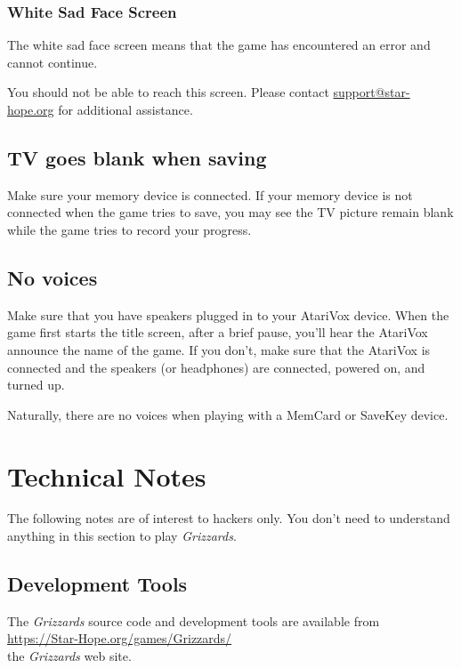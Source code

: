 \documentclass[10pt,twocolumn,openany,article]{memoir}
\begin{document}
\begin{description}
\subsection{White Sad Face Screen}

The white sad  face screen means that the game  has encountered an error
and cannot continue. 

You  should   not  be  able   to  reach  this  screen.   Please  contact
\href{mailto:support@star-hope.org}{support@star-hope.org}           for
additional assistance.


\section{TV goes blank when saving}

Make sure your memory device is  connected. If your memory device is not
connected when the game tries to save, you may see the TV picture remain
blank while the game tries to record your progress.

\section{No voices}

Make sure  that you have  speakers plugged  in to your  AtariVox device.
When the game first starts the title screen, after a brief pause, you'll
hear the AtariVox announce the name of the game. If you don't, make sure
that  the AtariVox  is connected  and the  speakers (or  headphones) are
connected, powered on, and turned up.

Naturally,  there  are  no  voices   when  playing  with  a  MemCard  or
SaveKey device. 

\chapter{Technical Notes}

The following notes are of interest to hackers only. You don't need to
understand anything in this section to play \textit{Grizzards}.

\section{Development Tools}

The \textit{Grizzards}  source code and development  tools are available
from \\
\href{https://Star-Hope.org/games/Grizzards/}{https://Star-Hope.org/games/Grizzards/} \\
the \textit{Grizzards} web site.


\end{description}
\end{document}
